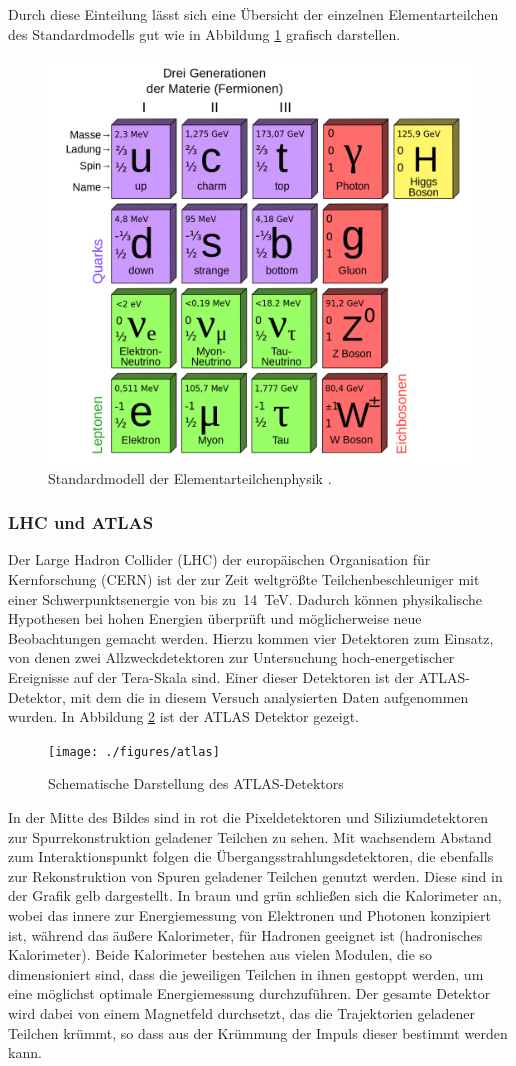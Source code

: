\documentclass[11pt, a4paper]{article}
\numberwithin{equation}{section}
\begin{document}
Durch diese Einteilung lässt sich eine Übersicht der einzelnen Elementarteilchen des Standardmodells gut wie in Abbildung \ref{fig:standardmodell} grafisch darstellen.
\begin{figure}[htbp]
	\centering
	\includegraphics[width=.6\textwidth]{./figures/standardmodell}
	\caption{Standardmodell der Elementarteilchenphysik \cite{wiki_standardmodell}.}
	\label{fig:standardmodell}
\end{figure}

\subsubsection{LHC und ATLAS}

Der Large Hadron Collider (LHC) der europäischen Organisation für Kernforschung (CERN) ist der zur Zeit weltgrößte Teilchenbeschleuniger mit einer Schwerpunktsenergie von bis zu~\SI{14}{TeV}.
Dadurch können physikalische Hypothesen bei hohen Energien überprüft und möglicherweise neue Beobachtungen gemacht werden.
Hierzu kommen vier Detektoren zum Einsatz, von denen zwei Allzweckdetektoren zur Untersuchung hoch-energetischer Ereignisse auf der Tera-Skala sind.
Einer dieser Detektoren ist der ATLAS-Detektor, mit dem die in diesem Versuch analysierten Daten aufgenommen wurden.
In Abbildung \ref{fig:atlas} ist der ATLAS Detektor gezeigt.
\begin{figure}[htbp]
	\centering
	\texttt{[image: ./figures/atlas]}
	\caption{Schematische Darstellung des ATLAS-Detektors \cite{cern}}
	\label{fig:atlas}
\end{figure}
In der Mitte des Bildes sind in rot die Pixeldetektoren und Siliziumdetektoren zur Spurrekonstruktion geladener Teilchen zu sehen.
Mit wachsendem Abstand zum Interaktionspunkt folgen die Übergangsstrahlungsdetektoren, die ebenfalls zur Rekonstruktion von Spuren geladener Teilchen genutzt werden.
Diese sind in der Grafik gelb dargestellt.
In braun und grün schließen sich die Kalorimeter an, wobei das innere zur Energiemessung von Elektronen und Photonen konzipiert ist, während das äußere Kalorimeter, für Hadronen geeignet ist (hadronisches Kalorimeter).
Beide Kalorimeter bestehen aus vielen Modulen, die so dimensioniert sind, dass die jeweiligen Teilchen in ihnen gestoppt werden, um eine möglichst optimale Energiemessung durchzuführen.
Der gesamte Detektor wird dabei von einem Magnetfeld durchsetzt, das die Trajektorien geladener Teilchen krümmt, so dass aus der Krümmung der Impuls dieser bestimmt werden kann.
\end{document}
